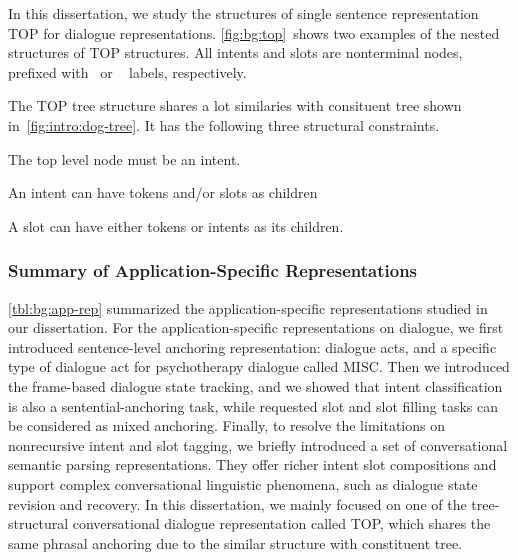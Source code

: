 In this dissertation, we study the structures of single sentence
representation TOP for dialogue
representations. \autoref{fig:bg:top}~shows two examples of the
nested structures of TOP structures. All intents and slots are
nonterminal nodes, prefixed with ~or
~ labels, respectively.

The TOP tree structure shares a lot similaries with consituent tree
shown in~\autoref{fig:intro:dog-tree}. It has the following three structural
constraints.
\begin{inparaenum}[(1)]
\item The top level node must be an intent.
\item An intent can have tokens and/or slots as children
\item A slot can have either tokens or intents as its children.
\end{inparaenum}

\subsubsection{Summary of Application-Specific Representations}
\label{ssec:bg:summary-application-rep}
\autoref{tbl:bg:app-rep} summarized the application-specific
representations studied in our dissertation. For the
application-specific representations on dialogue, we first introduced
sentence-level anchoring representation: dialogue acts, and a specific
type of dialogue act for psychotherapy dialogue called MISC. Then we
introduced the frame-based dialogue state tracking, and we showed that
intent classification is also a sentential-anchoring task, while
requested slot and slot filling tasks can be considered as mixed
anchoring. Finally, to resolve the limitations on nonrecursive intent
and slot tagging, we briefly introduced a set of conversational
semantic parsing representations. They offer richer intent slot
compositions and support complex conversational linguistic phenomena,
such as dialogue state revision and recovery.  In this dissertation,
we mainly focused on one of the tree-structural conversational
dialogue representation called TOP, which shares the same phrasal
anchoring due to the similar structure with constituent tree.

